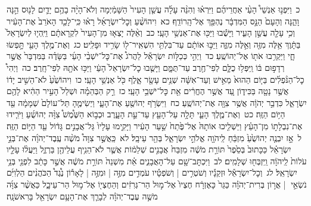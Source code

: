 \documentclass[18pt]{article}
\newcommand{\vart}[1]{\Bfootnote{#1}}	%
\begin{document}
 {\loc כ~}וַיִּפְנ֣וּ אַנְשֵׁי֩ הָעַ֨י אַחֲרֵיהֶ֜ם וַיִּרְא֗וּ וְהִנֵּ֨ה עָלָ֜ה עֲשַׁ֤ן הָעִיר֙ הַשָּׁמַ֔יְמָה וְלֹא־הָיָ֨ה בָהֶ֥ם יָדַ֛יִם לָנ֖וּס הֵ֣נָּה וָהֵ֑נָּה וְהָעָם֙ הַנָּ֣ס הַמִּדְבָּ֔ר נֶהְפַּ֖ךְ אֶל־הָֽרוֹדֵֽף׃ \startlock
 {\loc כא~}וִיהוֹשֻׁ֨עַ וְכׇל־יִשְׂרָאֵ֜ל רָא֗וּ כִּֽי־לָכַ֤ד הָאֹרֵב֙ אֶת־הָעִ֔יר וְכִ֥י עָלָ֖ה עֲשַׁ֣ן הָעִ֑יר וַיָּשֻׁ֕בוּ וַיַּכּ֖וּ אֶת־אַנְשֵׁ֥י הָעָֽי׃ \startlock
 {\loc כב~}וְאֵ֨לֶּה יָצְא֤וּ מִן־הָעִיר֙ לִקְרָאתָ֔ם וַיִּֽהְי֤וּ לְיִשְׂרָאֵל֙ בַּתָּ֔וֶךְ אֵ֥לֶּה מִזֶּ֖ה וְאֵ֣לֶּה מִזֶּ֑ה וַיַּכּ֣וּ אוֹתָ֔ם עַד־בִּלְתִּ֥י הִשְׁאִֽיר־ל֖וֹ שָׂרִ֥יד וּפָלִֽיט׃ \startlock
 {\loc כג~}וְאֶת־מֶ֥לֶךְ הָעַ֖י תָּ֣פְשׂוּ חָ֑י וַיַּקְרִ֥בוּ אֹת֖וֹ אֶל־יְהוֹשֻֽׁעַ׃ \startlock
 {\loc כד~}וַיְהִ֣י כְּכַלּ֣וֹת יִשְׂרָאֵ֡ל לַהֲרֹג֩ אֶת־כׇּל־יֹשְׁבֵ֨י הָעַ֜י בַּשָּׂדֶ֗ה בַּמִּדְבָּר֙ אֲשֶׁ֣ר רְדָפ֣וּם בּ֔וֹ וַֽיִּפְּל֥וּ כֻלָּ֛ם לְפִי־חֶ֖רֶב עַד־תֻּמָּ֑ם וַיָּשֻׁ֤בוּ כׇל־יִשְׂרָאֵל֙ הָעַ֔י וַיַּכּ֥וּ אֹתָ֖הּ לְפִי־חָֽרֶב׃ \startlock
 {\loc כה~}וַיְהִי֩ כׇל־הַנֹּ֨פְלִ֜ים בַּיּ֤וֹם הַהוּא֙ מֵאִ֣ישׁ וְעַד־אִשָּׁ֔ה שְׁנֵ֥ים עָשָׂ֖ר אָ֑לֶף כֹּ֖ל אַנְשֵׁ֥י הָעָֽי׃ \startlock
 {\loc כו~}וִיהוֹשֻׁ֙עַ֙ לֹא־הֵשִׁ֣יב יָד֔וֹ אֲשֶׁ֥ר נָטָ֖ה בַּכִּיד֑וֹן עַ֚ד אֲשֶׁ֣ר הֶחֱרִ֔ים אֵ֖ת כׇּל־יֹשְׁבֵ֥י הָעָֽי׃ \startlock
 {\loc כז~}רַ֣ק הַבְּהֵמָ֗ה וּשְׁלַל֙ הָעִ֣יר הַהִ֔יא  \edtext{בָּֽזְז֥וּ}{\vart{א=בָּֽזֲז֥וּ | }}  לָהֶ֖ם יִשְׂרָאֵ֑ל כִּדְבַ֣ר יְהֹוָ֔ה אֲשֶׁ֥ר צִוָּ֖ה אֶת־יְהוֹשֻֽׁעַ׃ \startlock
 {\loc כח~}וַיִּשְׂרֹ֥ף יְהוֹשֻׁ֖עַ אֶת־הָעָ֑י וַיְשִׂימֶ֤הָ תֵּל־עוֹלָם֙ שְׁמָמָ֔ה עַ֖ד הַיּ֥וֹם הַזֶּֽה׃ \startlock
 {\loc כט~}וְאֶת־מֶ֧לֶךְ הָעַ֛י תָּלָ֥ה עַל־הָעֵ֖ץ עַד־עֵ֣ת הָעָ֑רֶב וּכְב֣וֹא הַשֶּׁ֩מֶשׁ֩ צִוָּ֨ה יְהוֹשֻׁ֜עַ וַיֹּרִ֧ידוּ אֶת־נִבְלָת֣וֹ מִן־הָעֵ֗ץ וַיַּשְׁלִ֤יכוּ אוֹתָהּ֙ אֶל־פֶּ֙תַח֙ שַׁ֣עַר הָעִ֔יר וַיָּקִ֤ימוּ עָלָיו֙ גַּל־אֲבָנִ֣ים גָּד֔וֹל עַ֖ד הַיּ֥וֹם הַזֶּֽה׃ \startlock
 {\loc ל~}אָ֣ז יִבְנֶ֤ה יְהוֹשֻׁ֙עַ֙ מִזְבֵּ֔חַ לַֽיהֹוָ֖ה אֱלֹהֵ֣י יִשְׂרָאֵ֑ל בְּהַ֖ר עֵיבָֽל׃ \startlock
 {\loc לא~}כַּֽאֲשֶׁ֣ר צִוָּה֩ מֹשֶׁ֨ה עֶֽבֶד־יְהֹוָ֜ה אֶת־בְּנֵ֣י יִשְׂרָאֵ֗ל כַּכָּתוּב֙ בְּסֵ֙פֶר֙ תּוֹרַ֣ת מֹשֶׁ֔ה מִזְבַּח֙ אֲבָנִ֣ים שְׁלֵמ֔וֹת אֲשֶׁ֛ר לֹא־הֵנִ֥יף עֲלֵיהֶ֖ן בַּרְזֶ֑ל וַיַּעֲל֨וּ עָלָ֤יו עֹלוֹת֙ לַֽיהֹוָ֔ה וַֽיִּזְבְּח֖וּ שְׁלָמִֽים׃ \startlock
 {\loc לב~}וַיִּכְתׇּב־שָׁ֖ם עַל־הָאֲבָנִ֑ים אֵ֗ת מִשְׁנֵה֙ תּוֹרַ֣ת מֹשֶׁ֔ה אֲשֶׁ֣ר כָּתַ֔ב לִפְנֵ֖י בְּנֵ֥י יִשְׂרָאֵֽל׃ \startlock
 {\loc לג~}וְכׇל־יִשְׂרָאֵ֡ל וּזְקֵנָ֡יו וְשֹׁטְרִ֣ים  |  וְשֹׁפְטָ֡יו עֹמְדִ֣ים מִזֶּ֣ה  |  וּמִזֶּ֣ה  |  לָאָר֡וֹן נֶ֩גֶד֩ הַכֹּהֲנִ֨ים הַלְוִיִּ֜ם נֹשְׂאֵ֣י  |  אֲר֣וֹן בְּרִית־יְהֹוָ֗ה כַּגֵּר֙ כָּאֶזְרָ֔ח חֶצְיוֹ֙ אֶל־מ֣וּל הַר־גְּרִזִ֔ים וְהַחֶצְי֖וֹ אֶל־מ֣וּל הַר־עֵיבָ֑ל כַּאֲשֶׁ֨ר צִוָּ֜ה מֹשֶׁ֣ה עֶבֶד־יְהֹוָ֗ה לְבָרֵ֛ךְ אֶת־הָעָ֥ם יִשְׂרָאֵ֖ל בָּרִאשֹׁנָֽה׃ \startlock
\end{document}
